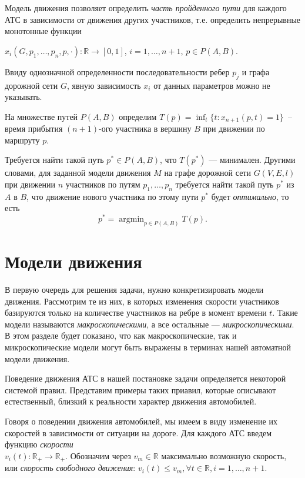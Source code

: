 \documentclass[12pt, a4paper]{article}
\DeclareMathOperator*{\argmin}{argmin}
\begin{document}
	Модель движения позволяет определить \textit{часть пройденного пути} для каждого АТС в зависимости от движения других участников, т.е. определить непрерывные монотонные функции
	\begin{center}
		$x_i(G, p_1, \dots, p_n, p, \cdot ) : \mathbb {R} \rightarrow [0 , 1] $, $i = 1, \dots, n+1$, $p \in P(A, B) $.
	\end{center}
	Ввиду однозначной определенности последовательности ребер $p_j$ и графа дорожной сети $G$, явную зависимость $x_i$ от данных параметров можно не указывать. 
	
	На множестве путей $P(A,B)$ определим $T(p) = \displaystyle \inf_t \{t : x_{n+1}(p, t) = 1\}$~-- время прибытия $(n+1)$-ого участника в вершину $B$ при движении по маршруту $p$. 
	\fi
	
	Требуется найти такой путь $p^* \in P(A, B)$, что $T(p^*)$ --- минимален. Другими словами, для заданной модели движения $M$ на графе дорожной сети $G(V, E, l)$ при движении $n$ участников по путям $p_1, \dots, p_n$ требуется найти такой путь $p^*$ из $A$ в $B$, что движение нового участника по этому пути $p^*$ будет \textit{оптимально}, то есть
	$$p^* = \argmin_{p \in P(A, B)} T(p).$$
	
	\newpage
	\section{Модели движения}
	
	В первую очередь для решения задачи, нужно конкретизировать модели движения. Рассмотрим те из них, в которых изменения скорости участников базируются только на количестве участников на ребре в момент времени $t$. Такие модели называются \textit{макроскопическими}, а все остальные --- \textit{микроскопическими}. В этом разделе будет показано, что как макроскопические, так и микроскопические модели могут быть выражены в терминах нашей автоматной модели движения.
	
	Поведение движения АТС в нашей постановке задачи определяется некоторой системой правил. Представим примеры таких приавил, которые описывают естественный, близкий к реальности характер движения автомобилей.
	
	Говоря о поведении движения автомобилей, мы имеем в виду изменение их скоростей в зависимости от ситуации на дороге. Для каждого АТС введем функцию \textit{скорости} \\ ${v_i(t) : \mathbb {R}_+ \rightarrow \mathbb {R}_+}$.  Обозначим через $v_m \in \mathbb {R}$ максимально возможную скорость, или \textit{скорость свободного движения}: $v_i(t) \leq v_m, \forall t \in \mathbb {R}, i = 1, \dots, n+1$.
	\fi
	
\end{document}
